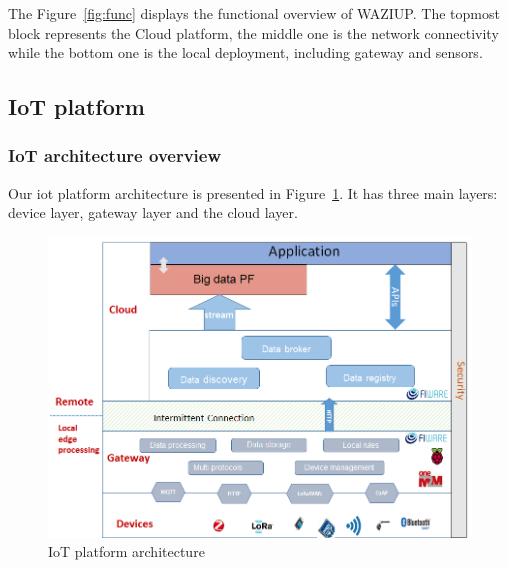 The Figure~\ref{fig:func} displays the functional overview of WAZIUP.
The topmost block represents the Cloud platform, the middle one is the network connectivity while the bottom one is the local deployment, including gateway and sensors.

\subsection{IoT platform}

\subsubsection{IoT architecture overview}

Our iot platform architecture is presented in Figure~\ref{fig:iotarchi}.
It has three main layers: device layer, gateway layer and the cloud layer.

\begin{figure}[h]
\centering
\includegraphics[width=\textwidth]{figs/iotarchi.png}
\caption{IoT platform architecture}
\label{fig:iotarchi}
\end{figure}



